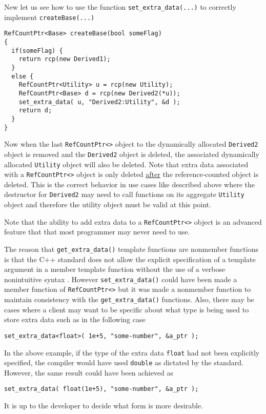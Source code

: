 New let us see how to use the function {}\texttt{set\-\_extra\-\_data(...)}
to correctly implement {}\texttt{create\-Base(...)}
%
{\scriptsize\begin{verbatim}
RefCountPtr<Base> createBase(bool someFlag)
{
  if(someFlag) {
    return rcp(new Derived1);
  }
  else {
    RefCountPtr<Utility> u = rcp(new Utility);
    RefCountPtr<Base> d = rcp(new Derived2(*u));
    set_extra_data( u, "Derived2:Utility", &d );
    return d;
  }
}
\end{verbatim}}
%
{}\noindent{}Now when the last {}\texttt{RefCountPtr<>} object to the
dynamically allocated {}\texttt{Derived2} object is removed and the
{}\texttt{Derived2} object is deleted, the associated dynamically
allocated {}\texttt{Utility} object will also be deleted.  Note that
extra data associated with a {}\texttt{RefCountPtr<>} object is only
deleted \underline{after} the reference-counted object is deleted.
This is the correct behavior in use cases like described above where
the destructor for {}\texttt{Derived2} may need to call functions on
its aggregate {}\texttt{Utility} object and therefore the utility
object must be valid at this point.

Note that the ability to add extra data to a {}\texttt{RefCountPtr<>}
object is an advanced feature that that most programmer may never need
to use.

The reason that {}\texttt{get\-\_extra\-\_data()} template functions
are nonmember functions is that the C++ standard does not allow the
explicit specification of a template argument in a member template
function without the use of a verbose nonintuitive syntax
{}\cite[C.13.6]{ref:stroustrup_2000}.  However
{}\texttt{set\-\_extra\-\_data()} could have been made a member
function of {}\texttt{RefCountPtr<>} but it was made a nonmember
function to maintain consistency with the
{}\texttt{get\-\_extra\-\_data()} functions.  Also, there may be cases
where a client may want to be specific about what type is being used
to store extra data such as in the following case
%
{\scriptsize\begin{verbatim}
set_extra_data<float>( 1e+5, "some-number", &a_ptr );
\end{verbatim}}
%
{}\noindent{}In the above example, if the type of the extra data
{}\texttt{float} had not been explicitly specified, the compiler
would have used {}\texttt{double} as dictated by the standard.
However, the same result could have been achieved as
%
{\scriptsize\begin{verbatim}
set_extra_data( float(1e+5), "some-number", &a_ptr );
\end{verbatim}}
%
{}\noindent{}It is up to the developer to decide what form is more
desirable.

